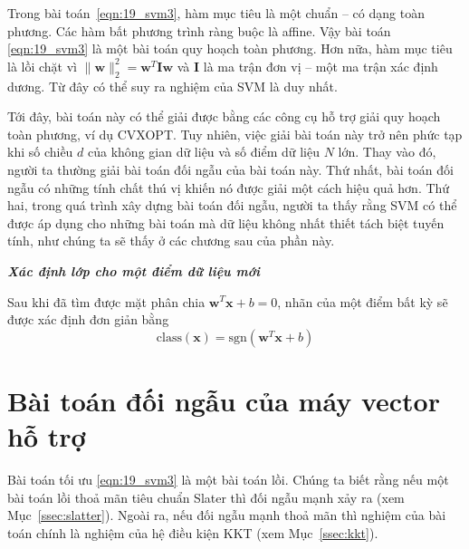 Trong bài toán~\eqref{eqn:19_svm3}, hàm mục tiêu
là một chuẩn -- có dạng toàn phương. Các hàm bất phương trình ràng buộc là affine. Vậy bài toán
\eqref{eqn:19_svm3} là một bài toán quy hoạch toàn phương. Hơn nữa, hàm mục tiêu là lồi chặt vì $\|\mathbf{w}\|_2^2 = \mathbf{w}^T\mathbf{I}\mathbf{w}$ và
$\mathbf{I}$ là ma trận đơn vị -- một ma trận xác định dương. Từ đây có thể
suy ra nghiệm của SVM là {duy nhất}.

Tới đây, bài toán này có thể giải được bằng các công cụ hỗ trợ giải quy hoạch toàn phương, ví dụ CVXOPT. Tuy nhiên, việc giải bài toán này trở nên
phức tạp khi số chiều $d$ của không gian dữ liệu và số điểm dữ liệu $N$ lớn. Thay vào đó, người ta thường giải bài toán đối ngẫu của bài toán này. Thứ
nhất, bài toán đối ngẫu có những tính chất thú vị khiến nó được giải một
cách hiệu quả hơn. Thứ hai, trong quá trình xây dựng bài toán đối ngẫu, người ta
thấy rằng SVM có thể được áp dụng cho những bài toán mà dữ liệu không nhất thiết tách biệt tuyến tính, như chúng ta sẽ thấy ở các chương sau của phần này.



\textit{\textbf{Xác định lớp cho một điểm dữ liệu mới} }

Sau khi đã tìm được mặt phân chia $\mathbf{w}^T\mathbf{x} + b = 0$, nhãn của
một điểm bất kỳ sẽ được xác định đơn giản bằng
\begin{equation*}
\text{class}(\mathbf{x}) = \text{sgn} (\mathbf{w}^T\mathbf{x} + b )
\end{equation*}

\section{Bài toán đối ngẫu của máy vector hỗ trợ}
\label{sec:19_svm3}
Bài toán tối ưu \eqref{eqn:19_svm3} là một bài toán lồi. Chúng ta
biết rằng nếu một bài toán lồi thoả mãn tiêu chuẩn Slater thì đối ngẫu mạnh xảy ra (xem Mục~\ref{ssec:slatter}). Ngoài ra, nếu đối ngẫu mạnh
thoả mãn thì nghiệm của bài toán chính là nghiệm của hệ điều kiện KKT (xem
Mục~\ref{ssec:kkt}).


